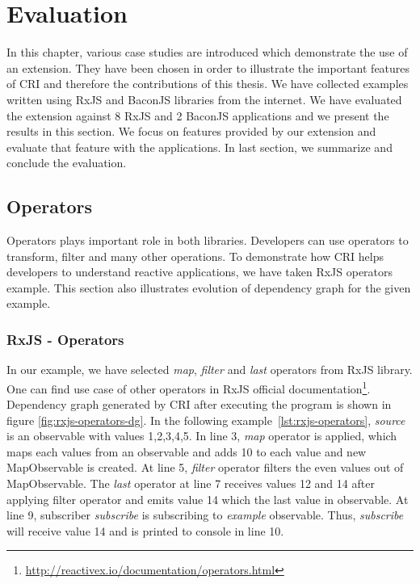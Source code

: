 \chapter{Evaluation} \label{chap:Evaluation}
In this chapter, various case studies are introduced which demonstrate the use of an extension. They have been chosen in order to illustrate the important features of CRI and therefore the contributions of this thesis. We have collected examples written using RxJS and BaconJS libraries from the internet. We have evaluated the extension against 8 RxJS and 2 BaconJS applications and we present the results in this section. We focus on features provided by our extension and evaluate that feature with the applications. In last section, we summarize and conclude the evaluation.

\section{Operators}
Operators plays important role in both libraries. Developers can use operators to transform, filter and many other operations. To demonstrate how CRI helps developers to understand reactive applications, we have taken RxJS operators example. This section also illustrates evolution of dependency graph for the given example.

\subsection{RxJS - Operators}
In our example, we have selected \textit{map}, \textit{filter} and \textit{last} operators from RxJS library. One can find use case of other operators in RxJS official documentation\footnote{\url{http://reactivex.io/documentation/operators.html}}. Dependency graph generated by CRI after executing the program is shown in figure \ref{fig:rxjs-operators-dg}. In the following example~\ref{lst:rxjs-operators}, \textit{source} is an observable with values 1,2,3,4,5. In line 3, \textit{map} operator is applied, which maps each values from an observable and adds 10 to each value and new MapObservable is created. At line 5, \textit{filter} operator filters the even values out of MapObservable. The \textit{last} operator at line 7 receives values 12 and 14 after applying filter operator and emits value 14 which the last value in observable. At line 9, subscriber \textit{subscribe} is subscribing to \textit{example} observable. Thus, \textit{subscribe} will receive value 14 and is printed to console in line 10.

